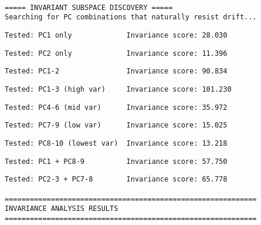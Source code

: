 \documentclass[
  letterpaper,
  DIV=11,
  numbers=noendperiod]{scrartcl}
\begin{document}
\begin{verbatim}

===== INVARIANT SUBSPACE DISCOVERY =====
Searching for PC combinations that naturally resist drift...
\end{verbatim}

\begin{verbatim}
Tested: PC1 only             Invariance score: 28.030
\end{verbatim}

\begin{verbatim}
Tested: PC2 only             Invariance score: 11.396
\end{verbatim}

\begin{verbatim}
Tested: PC1-2                Invariance score: 90.834
\end{verbatim}

\begin{verbatim}
Tested: PC1-3 (high var)     Invariance score: 101.230
\end{verbatim}

\begin{verbatim}
Tested: PC4-6 (mid var)      Invariance score: 35.972
\end{verbatim}

\begin{verbatim}
Tested: PC7-9 (low var)      Invariance score: 15.025
\end{verbatim}

\begin{verbatim}
Tested: PC8-10 (lowest var)  Invariance score: 13.218
\end{verbatim}

\begin{verbatim}
Tested: PC1 + PC8-9          Invariance score: 57.750
\end{verbatim}

\begin{verbatim}
Tested: PC2-3 + PC7-8        Invariance score: 65.778

============================================================
INVARIANCE ANALYSIS RESULTS
============================================================
\end{verbatim}
\end{document}
